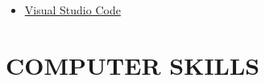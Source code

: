 \documentclass[10pt,a4paper,sans]{moderncv} %
\begin{document}
\begin{itemize}
\begin{multicols}{2}
\begin{itemize}
				
				
                 \item  {\large{}} \href{https://www.udemy.com/course/learn-visual-studio-code-v/}{Visual Studio Code}
				
				
				

			     
			     \vspace{-0.1 em} 
			     


			
				
			\end{itemize}
		\end{multicols}
		
		
	\end{itemize}
	
	\vspace{  -1.9 em}
	
	\section{COMPUTER SKILLS}
	
\end{document}
